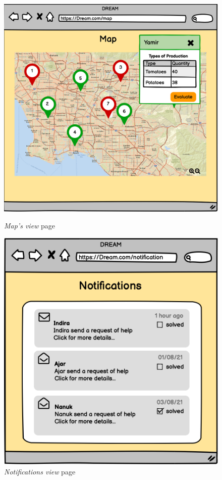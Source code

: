 \begin{figure}[H]
    \begin{minipage}{0.4\textwidth}
        \centering
        \includegraphics[width=1\textwidth]{images/mockups/PMMap.png}
        \caption{\emph{Map's view} page}
        \label{fig:pmmap}
    \end{minipage}\hfill
    \begin{minipage}{0.39\textwidth}
        \centering
        \includegraphics[width=1\textwidth]{images/mockups/PMNotifications.png}
        \caption{\emph{Notifications view} page}
        \label{fig:pmnotifs}
    \end{minipage}
\end{figure}

